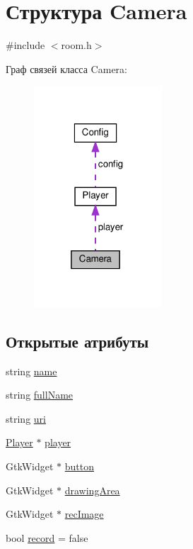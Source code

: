 \hypertarget{struct_camera}{}\section{Структура Camera}
\label{struct_camera}


{\ttfamily \#include $<$room.\+h$>$}



Граф связей класса Camera\+:\nopagebreak
\begin{figure}[H]
\begin{center}
\leavevmode
\includegraphics[width=136pt]{struct_camera__coll__graph}
\end{center}
\end{figure}
\subsection*{Открытые атрибуты}
\begin{DoxyCompactItemize}
\item 
string \hyperlink{struct_camera_a2adbd6da5cc41fb114c72b8616c00faf}{name}
\item 
string \hyperlink{struct_camera_a36dcf32b67cd3d0dcb45ab59fcc02cdb}{full\+Name}
\item 
string \hyperlink{struct_camera_a5d50a2e299b2cccd65b57982c678c8c4}{uri}
\item 
\hyperlink{class_player}{Player} $\ast$ \hyperlink{struct_camera_a9b1f95d3238bada633cf31b6e40c2d71}{player}
\item 
Gtk\+Widget $\ast$ \hyperlink{struct_camera_af463d4b36a2af1143d92b48cd5a8fa77}{button}
\item 
Gtk\+Widget $\ast$ \hyperlink{struct_camera_a6edbf520f8292d21ac6cccc61d45c41b}{drawing\+Area}
\item 
Gtk\+Widget $\ast$ \hyperlink{struct_camera_af6f95a716318992fa911c03349ec44f6}{rec\+Image}
\item 
bool \hyperlink{struct_camera_ab381a0e30d838132bea08b14686ea2f5}{record} = false
\end{DoxyCompactItemize}



